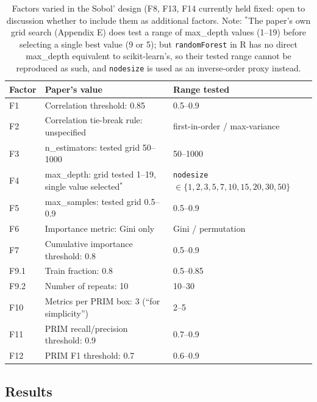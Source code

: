 \documentclass[sn-basic]{sn-jnl}%
\begin{document}
\begin{table}[h]
	\centering
	\caption{Factors varied in the Sobol' design (F8, F13, F14 currently held
		fixed: open to discussion whether to include them as additional factors. Note: $^{*}$The paper's own grid search (Appendix E) does test a range of
		max\_depth values (1--19) before selecting a single best value (9 or 5); but \texttt{randomForest} in R has no direct max\_depth equivalent to
		scikit-learn's, so their tested range cannot be reproduced as such, and \texttt{nodesize} is used as an inverse-order proxy instead.}
	\begin{tabular}{@{}lll@{}}
		\toprule
		Factor & Paper's value & Range tested \\
		\midrule
		F1  & Correlation threshold: 0.85                            & 0.5--0.9 \\
		F2  & Correlation tie-break rule: unspecified                & first-in-order / max-variance \\
		F3  & n\_estimators: tested grid 50--1000                    & 50--1000 \\
		F4  & max\_depth: grid tested 1--19, single value selected$^{*}$ & \texttt{nodesize} $\in \{1,2,3,5,7,10,15,20,30,50\}$ \\
		F5  & max\_samples: tested grid 0.5--0.9                     & 0.5--0.9 \\
		F6  & Importance metric: Gini only                           & Gini / permutation \\
		F7  & Cumulative importance threshold: 0.8                   & 0.5--0.9 \\
		F9.1 & Train fraction: 0.8                                   & 0.5--0.85 \\
		F9.2 & Number of repeats: 10                                 & 10--30 \\
		F10 & Metrics per PRIM box: 3 (``for simplicity'')           & 2--5 \\
		F11 & PRIM recall/precision threshold: 0.9                   & 0.7--0.9 \\
		F12 & PRIM F1 threshold: 0.7                                 & 0.6--0.9 \\
		\bottomrule
	\end{tabular}
		\label{tab:gsa_factors}
\end{table}


\subsection{Results}
\end{document}
